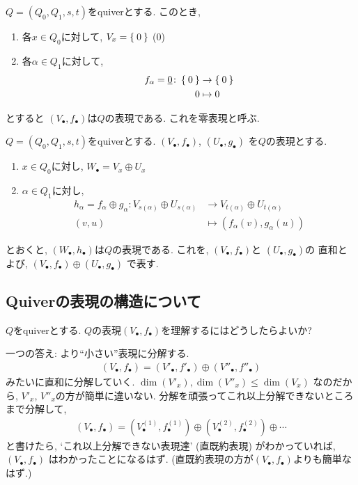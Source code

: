\begin{example}
  $Q=(Q_0,Q_1,s,t)$をquiverとする.
  このとき,
  \begin{enumerate}
  \item 各$x\in Q_0$に対して, $V_x=\Set{0}$ ($0$)
  \item 各$\alpha\in Q_1$に対して,
    \begin{align*}
      f_\alpha = \underline{0} \colon \Set{0} &\to \Set{0}\\
      0&\mapsto 0
    \end{align*}
  \end{enumerate}
  とすると
  $(V_\bullet,f_\bullet)$は$Q$の表現である.
  これを零表現と呼ぶ.
\end{example}

\begin{example}
  $Q=(Q_0,Q_1,s,t)$をquiverとする.
  $(V_\bullet, f_\bullet)$,
  $(U_\bullet, g_\bullet)$
  を$Q$の表現とする.
  \begin{enumerate}
  \item
    $x\in Q_0$に対し,
    $W_\bullet=V_x\oplus U_x$
  \item
    $\alpha\in Q_1$に対し, 
    \begin{align*}
      h_\alpha = f_\alpha\oplus g_\alpha \colon
      V_{s(\alpha)}\oplus U_{s(\alpha)}&\to
      V_{t(\alpha)}\oplus U_{t(\alpha)}
      \\
      (v,u)&\mapsto (f_\alpha(v),g_\alpha(u))
    \end{align*}
  \end{enumerate}
    とおくと,
    $(W_\bullet,h_\bullet)$は$Q$の表現である.
    これを,
    $(V_\bullet, f_\bullet)$と
    $(U_\bullet, g_\bullet)$の
    直和とよび,
    $(V_\bullet, f_\bullet)\oplus (U_\bullet, g_\bullet)$
    で表す.
  \end{example}

\subsection{Quiverの表現の構造について}

$Q$をquiverとする.
$Q$の表現$(V_\bullet,f_\bullet)$を理解するにはどうしたらよいか?

一つの答え:
より``小さい''表現に分解する.
\begin{align*}
  (V_\bullet,f_\bullet)=
  (V'_\bullet,f'_\bullet)\oplus (V''_\bullet,f''_\bullet)
\end{align*}
みたいに直和に分解していく.
$\dim(V'_x),\dim(V''_x)\leq\dim(V_x)$
なのだから, $V'_x$, $V''_x$の方が簡単に違いない.
分解を頑張ってこれ以上分解できないところまで分解して,
\begin{align*}
(V_\bullet,f_\bullet)=
  (V^{(1)}_\bullet,f^{(1)}_\bullet)\oplus (V^{(2)}_\bullet,f^{(2)}_\bullet)
  \oplus \cdots
\end{align*}
と書けたら,
`これ以上分解できない表現達' (直既約表現)
がわかっていれば,
$(V_\bullet,f_\bullet)$
はわかったことになるはず.
(直既約表現の方が$(V_\bullet,f_\bullet)$よりも簡単なはず.)

